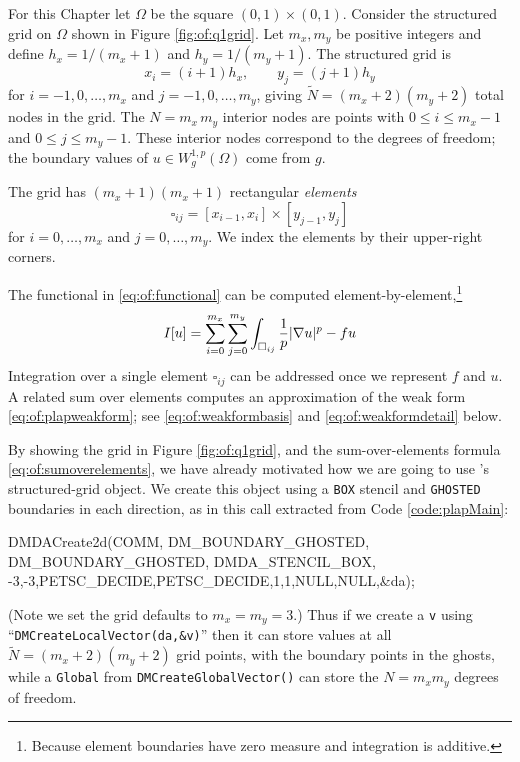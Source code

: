 For this Chapter let $\Omega$ be the square $(0,1)\times (0,1)$.  Consider the structured grid on $\Omega$ shown in Figure \ref{fig:of:q1grid}.  Let $m_x,m_y$ be positive integers and define $h_x = 1/(m_x+1)$ and $h_y = 1/(m_y+1)$.  The structured grid is
\begin{equation}
x_i = (i+1) h_x, \qquad y_j = (j+1) h_y \label{eq:of:structuredgridindexing}
\end{equation}
for $i=-1,0,\dots,m_x$ and $j=-1,0,\dots,m_y$, giving $\tilde N = (m_x+2)(m_y+2)$ total nodes in the grid.  The $N=m_x\, m_y$ interior nodes are points with $0 \le i \le m_x-1$ and $0 \le j \le m_y-1$.  These interior nodes correspond to the degrees of freedom; the boundary values of $u\in W_g^{1,p}(\Omega)$ come from $g$. 

The grid has $(m_x+1)(m_x+1)$ rectangular \emph{elements}
   $$\square_{ij} = [x_{i-1},x_i] \times [y_{j-1},y_j]$$
for $i=0,\dots,m_x$ and $j=0,\dots,m_y$.  We index the elements by their upper-right corners.

The functional in \eqref{eq:of:functional} can be computed element-by-element,\footnote{Because element boundaries have zero measure and integration is additive.}
\begin{equation}
I[u] = \sum_{i=0}^{m_x} \sum_{j=0}^{m_y} \int_{\square_{ij}} \frac{1}{p} |\nabla u|^p - fu  \label{eq:of:sumoverelements}
\end{equation}
Integration over a single element $\square_{ij}$ can be addressed once we represent $f$ and $u$.  A related sum over elements computes an approximation of the weak form \eqref{eq:of:plapweakform}; see \eqref{eq:of:weakformbasis} and \eqref{eq:of:weakformdetail} below.

By showing the grid in Figure \ref{fig:of:q1grid}, and the sum-over-elements formula \eqref{eq:of:sumoverelements}, we have already motivated how we are going to use \PETSc's \pDMDA structured-grid object.  We create this object using a \texttt{BOX} stencil and \texttt{GHOSTED} boundaries in each direction, as in this call extracted from Code \ref{code:plapMain}:
\begin{code}
  DMDACreate2d(COMM,
      DM_BOUNDARY_GHOSTED, DM_BOUNDARY_GHOSTED, DMDA_STENCIL_BOX,
      -3,-3,PETSC_DECIDE,PETSC_DECIDE,1,1,NULL,NULL,&da);
\end{code}
(Note we set the grid defaults to $m_x=m_y=3$.)  Thus if we create a \pVec \texttt{v} using ``\texttt{DMCreateLocalVector(da,\&v)}'' then it can store values at all $\tilde N = (m_x+2)(m_y+2)$ grid points, with the boundary points in the ghosts, while a \texttt{Global} \pVec from \texttt{DMCreateGlobalVector()} can store the $N=m_x m_y$ degrees of freedom.

